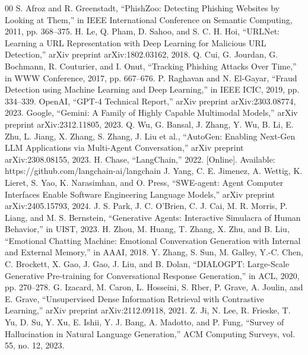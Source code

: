 \documentclass[conference]{IEEEtran}
\begin{document}
\begin{thebibliography}{00}
 S. Afroz and R. Greenstadt, ``PhishZoo: Detecting Phishing Websites by Looking at Them,'' in IEEE International Conference on Semantic Computing, 2011, pp. 368--375.
 H. Le, Q. Pham, D. Sahoo, and S. C. H. Hoi, ``URLNet: Learning a URL Representation with Deep Learning for Malicious URL Detection,'' arXiv preprint arXiv:1802.03162, 2018.
 Q. Cui, G. Jourdan, G. Bochmann, R. Couturier, and I. Onut, ``Tracking Phishing Attacks Over Time,'' in WWW Conference, 2017, pp. 667--676.
 P. Raghavan and N. El-Gayar, ``Fraud Detection using Machine Learning and Deep Learning,'' in IEEE ICIC, 2019, pp. 334--339.
 OpenAI, ``GPT-4 Technical Report,'' arXiv preprint arXiv:2303.08774, 2023.
 Google, ``Gemini: A Family of Highly Capable Multimodal Models,'' arXiv preprint arXiv:2312.11805, 2023.
 Q. Wu, G. Bansal, J. Zhang, Y. Wu, B. Li, E. Zhu, L. Jiang, X. Zhang, S. Zhang, J. Liu et al., ``AutoGen: Enabling Next-Gen LLM Applications via Multi-Agent Conversation,'' arXiv preprint arXiv:2308.08155, 2023.
 H. Chase, ``LangChain,'' 2022. [Online]. Available: https://github.com/langchain-ai/langchain
 J. Yang, C. E. Jimenez, A. Wettig, K. Lieret, S. Yao, K. Narasimhan, and O. Press, ``SWE-agent: Agent Computer Interfaces Enable Software Engineering Language Models,'' arXiv preprint arXiv:2405.15793, 2024.
 J. S. Park, J. C. O'Brien, C. J. Cai, M. R. Morris, P. Liang, and M. S. Bernstein, ``Generative Agents: Interactive Simulacra of Human Behavior,'' in UIST, 2023.
 H. Zhou, M. Huang, T. Zhang, X. Zhu, and B. Liu, ``Emotional Chatting Machine: Emotional Conversation Generation with Internal and External Memory,'' in AAAI, 2018.
 Y. Zhang, S. Sun, M. Galley, Y.-C. Chen, C. Brockett, X. Gao, J. Gao, J. Liu, and B. Dolan, ``DIALOGPT: Large-Scale Generative Pre-training for Conversational Response Generation,'' in ACL, 2020, pp. 270--278.
 G. Izacard, M. Caron, L. Hosseini, S. Rber, P. Grave, A. Joulin, and E. Grave, ``Unsupervised Dense Information Retrieval with Contrastive Learning,'' arXiv preprint arXiv:2112.09118, 2021.
 Z. Ji, N. Lee, R. Frieske, T. Yu, D. Su, Y. Xu, E. Ishii, Y. J. Bang, A. Madotto, and P. Fung, ``Survey of Hallucination in Natural Language Generation,'' ACM Computing Surveys, vol. 55, no. 12, 2023.
\end{thebibliography}

\vspace{12pt}
\end{document}
